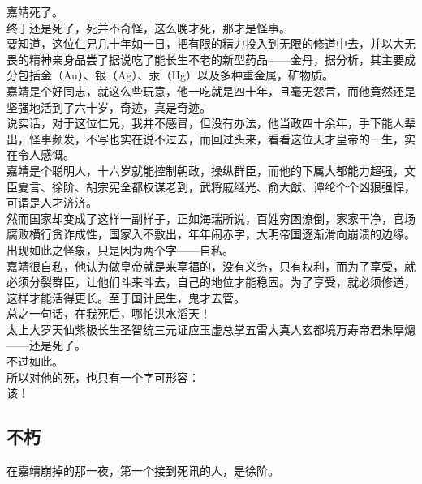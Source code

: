\begin{multicols}{\theparacolNo}
嘉靖死了。\\

终于还是死了，死并不奇怪，这么晚才死，那才是怪事。\\

要知道，这位仁兄几十年如一日，把有限的精力投入到无限的修道中去，并以大无畏的精神亲身品尝了据说吃了能长生不老的新型药品——金丹，据分析，其主要成分包括金（Au）、银（Ag）、汞（Hg）以及多种重金属，矿物质。\\

嘉靖是个好同志，就这么些玩意，他一吃就是四十年，且毫无怨言，而他竟然还是坚强地活到了六十岁，奇迹，真是奇迹。\\

说实话，对于这位仁兄，我并不感冒，但没有办法，他当政四十余年，手下能人辈出，怪事频发，不写也实在说不过去，而回过头来，看看这位天才皇帝的一生，实在令人感慨。\\

嘉靖是个聪明人，十六岁就能控制朝政，操纵群臣，而他的下属大都能力超强，文臣夏言、徐阶、胡宗宪全都权谋老到，武将戚继光、俞大猷、谭纶个个凶狠强悍，可谓是人才济济。\\

然而国家却变成了这样一副样子，正如海瑞所说，百姓穷困潦倒，家家干净，官场腐败横行贪诈成性，国家入不敷出，年年闹赤字，大明帝国逐渐滑向崩溃的边缘。\\

出现如此之怪象，只是因为两个字——自私。\\

嘉靖很自私，他认为做皇帝就是来享福的，没有义务，只有权利，而为了享受，就必须分裂群臣，让他们斗来斗去，自己的地位才能稳固。为了享受，就必须修道，这样才能活得更长。至于国计民生，鬼才去管。\\

总之一句话，在我死后，哪怕洪水滔天！\\

太上大罗天仙紫极长生圣智统三元证应玉虚总掌五雷大真人玄都境万寿帝君朱厚熜——还是死了。\\

不过如此。\\

所以对他的死，也只有一个字可形容：\\

该！\\

\subsection{不朽}
在嘉靖崩掉的那一夜，第一个接到死讯的人，是徐阶。\\


\end{multicols}
